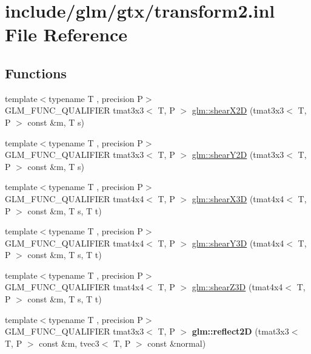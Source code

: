 \hypertarget{transform2_8inl}{}\section{include/glm/gtx/transform2.inl File Reference}
\label{transform2_8inl}
\subsection*{Functions}
\begin{DoxyCompactItemize}
\item 
{\footnotesize template$<$typename T , precision P$>$ }\\G\+L\+M\+\_\+\+F\+U\+N\+C\+\_\+\+Q\+U\+A\+L\+I\+F\+I\+ER tmat3x3$<$ T, P $>$ \hyperlink{group__gtx__transform2_ga10f6c62d8f827c4cacedb71fd05e4ba2}{glm\+::shear\+X2D} (tmat3x3$<$ T, P $>$ const \&m, T s)
\item 
{\footnotesize template$<$typename T , precision P$>$ }\\G\+L\+M\+\_\+\+F\+U\+N\+C\+\_\+\+Q\+U\+A\+L\+I\+F\+I\+ER tmat3x3$<$ T, P $>$ \hyperlink{group__gtx__transform2_ga21ade82859e09a5cdaf4a01fbf8dc61b}{glm\+::shear\+Y2D} (tmat3x3$<$ T, P $>$ const \&m, T s)
\item 
{\footnotesize template$<$typename T , precision P$>$ }\\G\+L\+M\+\_\+\+F\+U\+N\+C\+\_\+\+Q\+U\+A\+L\+I\+F\+I\+ER tmat4x4$<$ T, P $>$ \hyperlink{group__gtx__transform2_gae06ce274e4754f925d5d68440e89452e}{glm\+::shear\+X3D} (tmat4x4$<$ T, P $>$ const \&m, T s, T t)
\item 
{\footnotesize template$<$typename T , precision P$>$ }\\G\+L\+M\+\_\+\+F\+U\+N\+C\+\_\+\+Q\+U\+A\+L\+I\+F\+I\+ER tmat4x4$<$ T, P $>$ \hyperlink{group__gtx__transform2_ga31253ea18fdcdfde08c134c8b67688f7}{glm\+::shear\+Y3D} (tmat4x4$<$ T, P $>$ const \&m, T s, T t)
\item 
{\footnotesize template$<$typename T , precision P$>$ }\\G\+L\+M\+\_\+\+F\+U\+N\+C\+\_\+\+Q\+U\+A\+L\+I\+F\+I\+ER tmat4x4$<$ T, P $>$ \hyperlink{group__gtx__transform2_ga5558ac64a7144685bf2eb4483a0e2f51}{glm\+::shear\+Z3D} (tmat4x4$<$ T, P $>$ const \&m, T s, T t)
\item 
\mbox{\label{transform2_8inl_ac373598f80d93433e720b74e0cf8f556}} 
{\footnotesize template$<$typename T , precision P$>$ }\\G\+L\+M\+\_\+\+F\+U\+N\+C\+\_\+\+Q\+U\+A\+L\+I\+F\+I\+ER tmat3x3$<$ T, P $>$ {\bfseries glm\+::reflect2D} (tmat3x3$<$ T, P $>$ const \&m, tvec3$<$ T, P $>$ const \&normal)

\end{DoxyCompactItemize}
